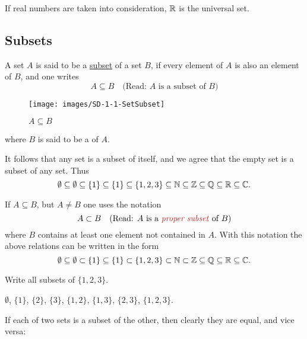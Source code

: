 \documentclass[11pt]{amsbook}
\begin{document}
If real numbers are taken into consideration, 
$\mathbb{R}$ is the universal set. 




\subsection{Subsets}
\label{subsec:Subsets} 

A set $A$ is said to be a \underline{subset} of a set $B$, 
if every element of $A$ is also an element of $B$, 
and one writes 
\[
	A \subseteq B
	\quad
	\text{(Read: $A$ is a subset of $B$)}
\]
\begin{figure}[htb]
	\centering
	\texttt{[image: images/SD-1-1-SetSubset]}
	\caption{$A \subseteq B$}
	\label{fig:SDb1p1SetSubset}
\end{figure}
where $B$ is said to be a  of $A$.

It follows that any set is a subset of itself, 
and we agree that the empty set is a subset of any set. 
Thus 
\[
	\emptyset 
	\subseteq \emptyset
	\subseteq \{ 1 \}
	\subseteq \{ 1 \}
	\subseteq \{ 1, 2, 3 \}
	\subseteq \mathbb{N} 
	\subseteq \mathbb{Z}
	\subseteq \mathbb{Q}
	\subseteq \mathbb{R}
	\subseteq \mathbb{C}.
\]

If $A \subseteq B$, 
but $A \ne B$ one uses the notation
\[
	A \subset B
	\quad
	\text{(Read: $A$ is a \hDefined{proper subset} of $B$)}
\]
where $B$ contains at least one element not contained in $A$. 
With this notation the above relations can be written in the form
\[
	\emptyset 
	\subseteq \emptyset
	\subset   \{ 1 \}
	\subseteq \{ 1 \}
	\subset   \{ 1, 2, 3 \}
	\subset   \mathbb{N} 
	\subset   \mathbb{Z}
	\subseteq \mathbb{Q}
	\subseteq \mathbb{R}
	\subseteq \mathbb{C}.
\]

\begin{exmp} 
	Write all subsets of $\{ 1, 2, 3 \}$.

	\begin{hSolution}
		$\emptyset$, 
		$\{1\}$,
		$\{2\}$,
		$\{3\}$,
		$\{1,2\}$,
		$\{1,3\}$,
		$\{2,3\}$,
		$\{1,2,3\}$.
	\end{hSolution}
\end{exmp}

If each of two sets is a subset of the other, then clearly they are equal, and vice versa:
\end{document}
